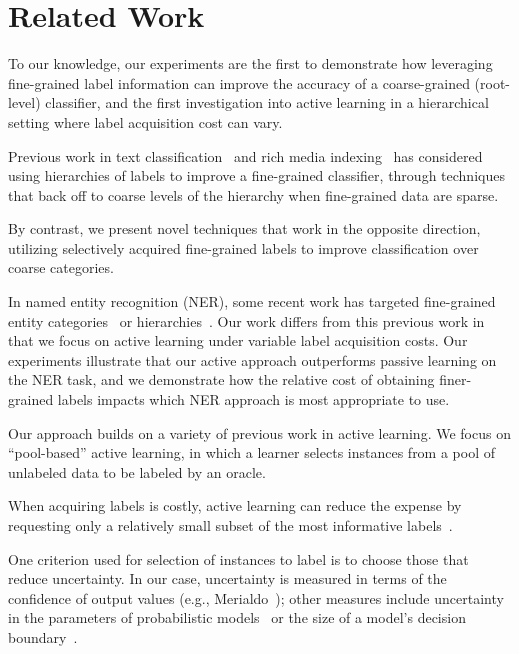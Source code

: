 \documentclass[10pt, conference, compsocconf]{IEEEtran}
\begin{document}


%


\section{Related Work}
\label{sec:relwork}

To our knowledge, our experiments are the first to demonstrate
how leveraging fine-grained label information can improve the
accuracy of a coarse-grained (root-level) classifier, and the first
investigation into active learning in a hierarchical setting where
label acquisition cost can vary.

Previous work in text classification~\cite{mccallum1998improving} and
rich media indexing~\cite{jiang2013} has considered using
hierarchies of labels to improve a fine-grained classifier, through
techniques that back off to coarse
levels of the hierarchy when fine-grained data are sparse.

By contrast, we present novel techniques
that work in the opposite direction, utilizing selectively
acquired fine-grained labels to improve
classification over coarse categories.


In named entity recognition (NER), some recent work has targeted
fine-grained entity categories~\cite{fleischman2002fine,ling2012fine}
or hierarchies~\cite{yosef2012hyena}.  Our work differs from this
previous work in that we focus on active learning under variable
label acquisition costs.
Our experiments illustrate that our active approach outperforms
passive learning on the NER task, and we demonstrate how the
relative cost of obtaining finer-grained labels impacts
which NER approach is most appropriate to use.

Our approach builds on a variety of previous work in active learning.
We focus on ``pool-based'' active learning, in which
a learner selects instances from a pool of unlabeled data to be 
labeled by an oracle.

When acquiring
labels is costly, active learning can reduce
the expense by requesting only a relatively small subset
of the most informative labels~\cite{Rubens2011}.

One criterion used for selection of instances to label is to
choose those that reduce uncertainty. In our case,
uncertainty is measured in terms of the confidence of output values
(e.g., Merialdo~\cite{Merialdo2001}); other measures include
uncertainty in the parameters of probabilistic models~\cite{Hofmann2003}
or the size of a model's decision boundary~\cite{Schohn2000}.  
\end{document}

